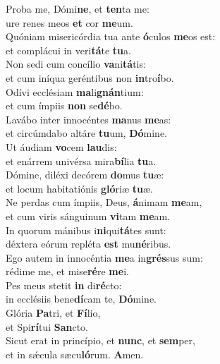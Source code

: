 \evenverse Proba me, Dómi\textbf{ne}, et \textbf{ten}ta me:~\*\\
\evenverse ure renes meos \textbf{et} cor \textbf{me}um.\\
\oddverse Quóniam misericórdia tua ante \textbf{ó}culos \textbf{me}os est:~\*\\
\oddverse et complácui in veri\textbf{tá}te \textbf{tu}a.\\
\evenverse Non sedi cum concílio \textbf{va}ni\textbf{tá}tis:~\*\\
\evenverse et cum iníqua geréntibus non \textbf{in}tro\textbf{í}bo.\\
\oddverse Odívi ecclésiam \textbf{ma}li\textbf{gnán}tium:~\*\\
\oddverse et cum ímpiis \textbf{non} se\textbf{dé}bo.\\
\evenverse Lavábo inter innocéntes \textbf{ma}nus \textbf{me}as:~\*\\
\evenverse et circúmdabo altáre \textbf{tu}um, \textbf{Dó}mine.\\
\oddverse Ut áudiam \textbf{vo}cem \textbf{lau}dis:~\*\\
\oddverse et enárrem univérsa mira\textbf{bí}lia \textbf{tu}a.\\
\evenverse Dómine, diléxi decórem \textbf{do}mus \textbf{tu}æ:~\*\\
\evenverse et locum habitatiónis \textbf{gló}riæ \textbf{tu}æ.\\
\oddverse Ne perdas cum ímpiis, Deus, \textbf{á}nimam \textbf{me}am,~\*\\
\oddverse et cum viris sánguinum \textbf{vi}tam \textbf{me}am.\\
\evenverse In quorum mánibus i\textbf{ni}qui\textbf{tá}tes sunt:~\*\\
\evenverse déxtera eórum repléta \textbf{est} mu\textbf{né}ribus.\\
\oddverse Ego autem in innocéntia \textbf{me}a in\textbf{grés}sus sum:~\*\\
\oddverse rédime me, et mise\textbf{ré}re \textbf{me}i.\\
\evenverse Pes meus stetit \textbf{in} di\textbf{ré}cto:~\*\\
\evenverse in ecclésiis bene\textbf{dí}cam te, \textbf{Dó}mine.\\
\oddverse Glória \textbf{Pa}tri, et \textbf{Fí}lio,~\*\\
\oddverse et Spi\textbf{rí}tui \textbf{San}cto.\\
\evenverse Sicut erat in princípio, et \textbf{nunc}, et \textbf{sem}per,~\*\\
\evenverse et in sǽcula sæcu\textbf{ló}rum. \textbf{A}men.\\
